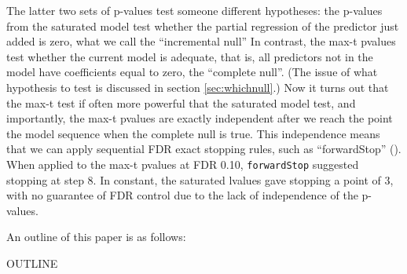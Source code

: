 \documentclass{article}
\begin{document}
The latter two sets of p-values test someone different hypotheses:  the p-values from the saturated model test whether the partial regression of the predictor just added is zero,
what we call the ``incremental null''
In contrast, the max-t pvalues test whether the current model is adequate, that is, all predictors not in the model  have coefficients equal to zero,
the ``complete null''. (The issue of what hypothesis to test is discussed in section \ref{sec:whichnull}.)
Now it turns out that the max-t test if often more powerful that the saturated model test, and importantly, the max-t pvalues are exactly
independent after we reach the point the model sequence when the complete null is true. This independence means that we can apply
sequential FDR exact stopping rules, such as ``forwardStop'' (\citet{sell2013sequential}). When applied to the max-t pvalues at FDR 0.10, {\tt forwardStop}
suggested stopping at step 8. In constant, the saturated lvalues gave stopping a point of 3, with no guarantee of FDR control
due to the lack of independence of the p-values.

An outline of this paper is as follows:

OUTLINE




\end{document}
